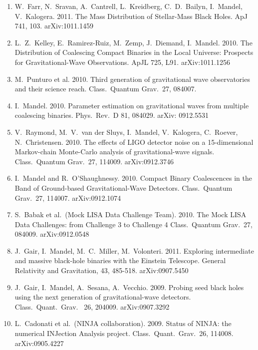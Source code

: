 \documentclass[margin,line]{res}
\begin{document}
\begin{resume}
\begin{enumerate}
\item  W.~Farr, N.~Sravan, A.~Cantrell, L.~Kreidberg, C.~D.~Bailyn, I.~Mandel, V.~Kalogera. 2011. The Mass Distribution of Stellar-Mass Black Holes. ApJ 741, 103. arXiv:1011.1459

\item  L.~Z.~Kelley, E.~Ramirez-Ruiz, M.~Zemp, J.~Diemand, I.~Mandel. 2010. The Distribution of Coalescing Compact Binaries in the Local Universe: Prospects for Gravitational-Wave Observations. ApJL 725, L91.  arXiv:1011.1256

\item  M.~Punturo et al. 2010. Third generation of gravitational wave observatories and their science reach.  Class.~Quantum Grav.~27, 084007.

\item  I.~Mandel. 2010.  Parameter estimation on gravitational waves from multiple coalescing binaries.  Phys.~Rev.~D 81, 084029. arXiv: 0912.5531

\item  V.~Raymond, M.~V.~van der Sluys, I.~Mandel, V.~Kalogera, C.~Roever, N.~Christensen. 2010. The effects of LIGO detector noise on a 15-dimensional Markov-chain Monte-Carlo analysis of gravitational-wave signals.  Class.~Quantum Grav.~27, 114009. arXiv:0912.3746

\item  I.~Mandel and R.~O'Shaughnessy.  2010.  Compact Binary Coalescences in the Band of Ground-based Gravitational-Wave Detectors.  Class.~Quantum Grav.~27, 114007. arXiv:0912.1074  

\item  S.~Babak et al.~(Mock LISA Data Challenge Team). 2010.  The Mock LISA Data Challenges: from Challenge 3 to Challenge 4 Class.~Quantum Grav.~27, 084009.  arXiv:0912.0548  

\item  J.~Gair, I.~Mandel, M.~C.~Miller, M.~Volonteri.  2011.  Exploring intermediate and massive black-hole binaries with the Einstein Telescope. General Relativity and Gravitation, 43, 485-518.  arXiv:0907.5450

\item  J.~Gair, I.~Mandel, A.~Sesana, A.~Vecchio.  2009. Probing seed black holes using the next generation of gravitational-wave detectors.  Class.~Quant.~Grav.~ 26, 204009.  arXiv:0907.3292

\item  L.~Cadonati et al.~(NINJA collaboration). 2009. Status of NINJA: the numerical INJection Analysis project.  Class.~Quant.~Grav.~26, 114008. arXiv:0905.4227


\end{enumerate}
\end{resume}
\end{document}
